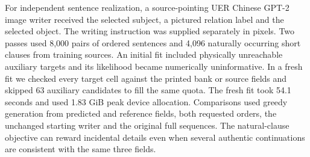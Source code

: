 For independent sentence realization, a source-pointing UER Chinese GPT-2 image writer received the selected subject, a pictured relation label and the selected object. The writing instruction was supplied separately in pixels. Two passes used 8,000 pairs of ordered sentences and 4,096 naturally occurring short clauses from training sources. An initial fit included physically unreachable auxiliary targets and its likelihood became numerically uninformative. In a fresh fit we checked every target cell against the printed bank or source fields and skipped 63 auxiliary candidates to fill the same quota. The fresh fit took 54.1 seconds and used 1.83 GiB peak device allocation. Comparisons used greedy generation from predicted and reference fields, both requested orders, the unchanged starting writer and the original full sequences. The natural-clause objective can reward incidental details even when several authentic continuations are consistent with the same three fields.
